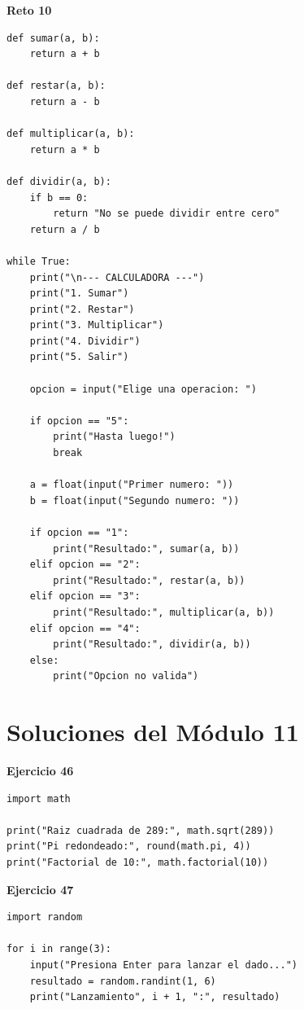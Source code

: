 \documentclass[12pt,a4paper]{article}
\begin{document}
\begin{cajaSolucion}
\textbf{Reto 10}
\begin{lstlisting}[style=pythonStyle]
def sumar(a, b):
    return a + b

def restar(a, b):
    return a - b

def multiplicar(a, b):
    return a * b

def dividir(a, b):
    if b == 0:
        return "No se puede dividir entre cero"
    return a / b

while True:
    print("\n--- CALCULADORA ---")
    print("1. Sumar")
    print("2. Restar")
    print("3. Multiplicar")
    print("4. Dividir")
    print("5. Salir")

    opcion = input("Elige una operacion: ")

    if opcion == "5":
        print("Hasta luego!")
        break

    a = float(input("Primer numero: "))
    b = float(input("Segundo numero: "))

    if opcion == "1":
        print("Resultado:", sumar(a, b))
    elif opcion == "2":
        print("Resultado:", restar(a, b))
    elif opcion == "3":
        print("Resultado:", multiplicar(a, b))
    elif opcion == "4":
        print("Resultado:", dividir(a, b))
    else:
        print("Opcion no valida")
\end{lstlisting}
\end{cajaSolucion}

\section{Soluciones del Módulo 11}

\begin{cajaSolucion}
\textbf{Ejercicio 46}
\begin{lstlisting}[style=pythonStyle]
import math

print("Raiz cuadrada de 289:", math.sqrt(289))
print("Pi redondeado:", round(math.pi, 4))
print("Factorial de 10:", math.factorial(10))
\end{lstlisting}
\end{cajaSolucion}

\begin{cajaSolucion}
\textbf{Ejercicio 47}
\begin{lstlisting}[style=pythonStyle]
import random

for i in range(3):
    input("Presiona Enter para lanzar el dado...")
    resultado = random.randint(1, 6)
    print("Lanzamiento", i + 1, ":", resultado)
\end{lstlisting}
\end{cajaSolucion}
\end{document}

